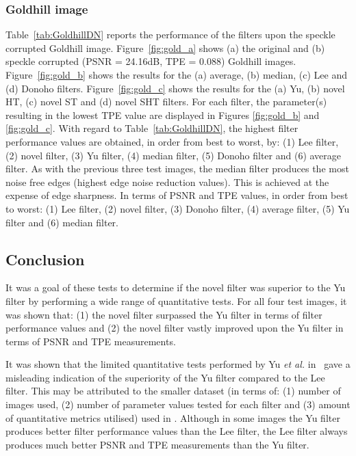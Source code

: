 \documentclass[12pt]{report}
\begin{document}
\subsubsection{Goldhill image}
Table~\ref{tab:GoldhillDN} reports the performance of the filters upon the speckle corrupted Goldhill image.
Figure~\ref{fig:gold_a} shows (a) the original and (b) speckle corrupted (PSNR = 24.16dB, TPE = 0.088) Goldhill images.
Figure~\ref{fig:gold_b} shows the results for the (a) average, (b) median, (c) Lee and (d) Donoho filters. 
Figure~\ref{fig:gold_c} shows the results for the (a) Yu, (b) novel HT, (c) novel ST and (d) novel SHT filters.
For each filter, the parameter(s) resulting in the lowest TPE value are displayed in Figures \ref{fig:gold_b} and \ref{fig:gold_c}.
With regard to Table~\ref{tab:GoldhillDN}, the highest filter performance values are obtained, in order from best to worst, by:
(1) Lee filter, (2) novel filter, (3) Yu filter, (4) median filter, (5) Donoho filter and (6) average filter. 
As with the previous three test images, the median filter produces the most noise free edges (highest
edge noise reduction values). This is achieved at the expense of edge sharpness. 
In terms of PSNR and TPE values, in order from best to worst:
(1) Lee filter, (2) novel filter, (3) Donoho filter, (4) average filter, (5) Yu filter and (6) median filter. 

\subsection{Conclusion}
It was a goal of these tests to determine if the novel filter was superior to the Yu filter by performing a wide
range of quantitative tests. For all four test images, it was shown that: (1) the novel filter surpassed the Yu filter
in terms of filter performance values and (2) the novel filter vastly improved upon the Yu filter in terms of PSNR and TPE measurements. 

It was shown that the limited quantitative tests performed by Yu \emph{et al.} in~\cite{yu96} gave a misleading
indication of the superiority of the Yu filter compared to the Lee filter. This may be attributed to the smaller dataset (in
terms of: (1) number of images used, (2) number of parameter values tested for each filter and (3) amount of quantitative metrics utilised) 
used in \cite{yu96}. Although in some images the Yu filter produces better filter performance values than the Lee filter, the Lee filter 
always produces much better PSNR and TPE measurements than the Yu filter.
\end{document}
